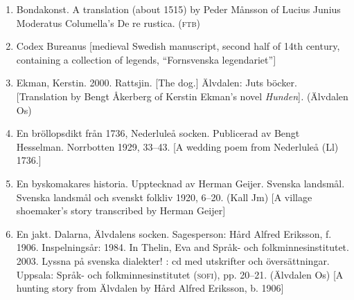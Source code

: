 \begin{enumerate}

\item[\sqbrSenum]

\label{bkm:Ref137881255}\label{bkm:Ref155341449}Bondakonst. A translation (about 1515) by Peder Månsson of Lucius Junius Moderatus Columella’s De re rustica. (\textsc{ftb}) 


\item[\sqbrSenum]

\label{bkm:Ref137883429}Codex Bureanus [medieval Swedish manuscript, second half of 14th century, containing a collection of legends, “Fornsvenska legendariet”] 


\item[\sqbrSenum]

\label{bkm:Ref141167264}\label{bkm:Ref150315907}Ekman, Kerstin. 2000. Rattsjin. [The dog.] Älvdalen: Juts böcker. [Translation by Bengt Åkerberg of Kerstin Ekman’s novel \textit{Hunden}]\textit{.} (Älvdalen Os)

\item[\sqbrSenum]

\label{bkm:Ref137881221}En bröllopsdikt från 1736, Nederluleå socken. Publicerad av Bengt Hesselman. Norrbotten 1929, 33--43. [A wedding poem from Nederluleå (Ll) 1736.]


\item[\sqbrSenum]

\label{bkm:Ref150587790}En byskomakares historia. Upptecknad av Herman Geijer. Svenska landsmål. Svenska landsmål och svenskt folkliv 1920, 6--20. (Kall Jm) [A village shoemaker’s story transcribed by Herman Geijer]

\item[\sqbrSenum]

\label{bkm:Ref155589051}En jakt. Dalarna, Älvdalens socken. Sagesperson: Hård Alfred Eriksson, f. 1906. Inspelningsår: 1984. In Thelin, Eva and Språk- och folkminnesinstitutet. 2003. Lyssna på svenska dialekter! : cd med utskrifter och översättningar. Uppsala: Språk- och folkminnesinstitutet (\textsc{sofi}), pp. 20--21. (Älvdalen Os) [A hunting story from Älvdalen by Hård Alfred Eriksson, b. 1906]


\end{enumerate}

